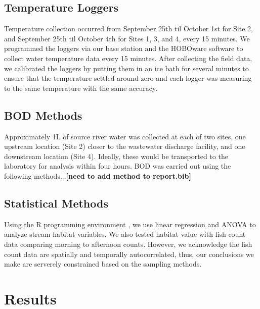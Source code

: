 \documentclass{article}
\begin{document}
\subsection{Temperature Loggers}

Temperature collection occurred from September 25th til October 1st for Site 2, and September 25th til October 4th for Sites 1, 3, and 4, every 15 minutes. We programmed the loggers via our base station and the HOBOware software to collect water temperature data every 15 minutes. After collecting the field data, we calibrated the loggers by putting them in an ice bath for several minutes to ensure that the temperature settled around zero and each logger was measuring to the same temperature with the same accuracy.

\subsection{BOD Methods}

Approximately 1L of source river water was collected at each of two sites, one upstream location (Site 2) closer to the wastewater discharge facility, and one downstream location (Site 4). Ideally, these would be transported to the laboratory for analysis within four hours. BOD was carried out using the following methods...\textbf{[need to add method to report.bib]}

\subsection{Statistical Methods}

Using the R programming environment \citep{CRAN}, we use linear regression and ANOVA to analyze stream habitat variables. We also tested habitat value with fish count data comparing morning to afternoon counts. However, we acknowledge the fish count data are spatially and temporally autocorrelated, thus, our conclusions we make are serverely constrained based on the sampling methods.

\section{Results}
\end{document}
